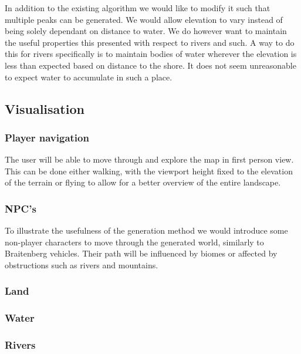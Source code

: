 In addition to the existing algorithm we would like to modify it such that multiple peaks can be generated. We would allow elevation to vary instead of being solely dependant on distance to water. We do however want to maintain the useful properties this presented with respect to rivers and such. A way to do this for rivers specifically is to maintain bodies of water wherever the elevation is less than expected based on distance to the shore. It does not seem unreasonable to expect water to accumulate in such a place. 

\subsection{Visualisation}

\subsubsection{Player navigation}

The user will be able to move through and explore the map in first person view. This can be done either walking, with the viewport height fixed to the elevation of the terrain or flying to allow for a better overview of the entire landscape.

\subsubsection{NPC's}

To illustrate the usefulness of the generation method we would introduce some non-player characters to move through the generated world, similarly to Braitenberg vehicles. Their path will be influenced by biomes or affected by obstructions such as rivers and mountains.

\subsubsection{Land}

\subsubsection{Water}

\subsubsection{Rivers}